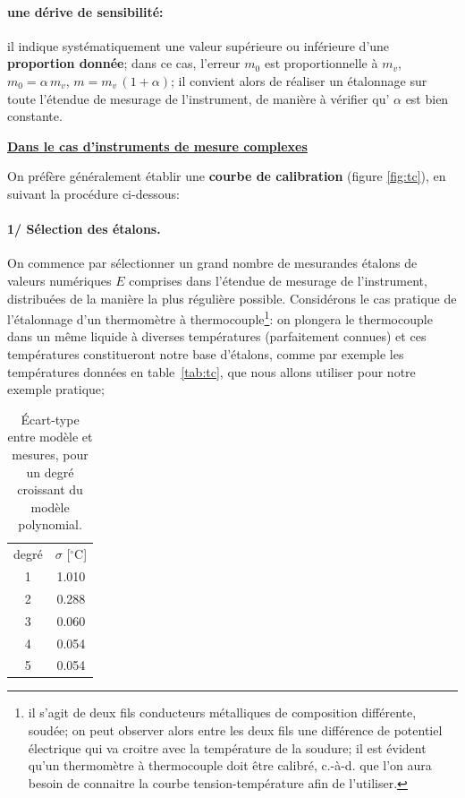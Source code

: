 \paragraph{une dérive de sensibilité:} il indique systématiquement une valeur supérieure ou inférieure d'une \textbf{proportion donnée}; dans ce cas, l'erreur $m_0$ est proportionnelle à $m_v$, $m_0=\alpha\,m_v$, $m=m_v\,(1+\alpha)$; il convient alors de réaliser un étalonnage sur toute l'étendue de mesurage de l'instrument, de manière à vérifier qu’ $\alpha$ est bien constante.

\begin{flushleft}
\underline{\textbf{Dans le cas d'instruments de mesure complexes}}
\end{flushleft}
On préfère généralement établir une \textbf{courbe de calibration} (figure \ref{fig:tc}), en suivant la procédure ci-dessous:
\paragraph{1/ Sélection des étalons.} On commence par sélectionner un grand nombre de mesurandes étalons de valeurs numériques $E$ comprises dans l'étendue de mesurage de l'instrument, distribuées de la manière la plus régulière possible. Considérons le cas pratique de l'étalonnage d'un thermomètre à thermocouple\footnote{il s'agit de deux fils conducteurs métalliques de composition différente, soudée; on peut observer alors entre les deux fils une différence de potentiel électrique qui va croitre avec la température de la soudure; il est évident qu'un thermomètre à thermocouple doit être calibré, c.-à-d. que l'on aura besoin de connaitre la courbe tension-température afin de l'utiliser.}: on plongera le thermocouple dans un même liquide à diverses températures (parfaitement connues) et ces températures constitueront notre base d'étalons, comme par exemple les températures données en table~\ref{tab:tc}, que nous allons utiliser pour notre exemple pratique;
\begin{table}
\vspace{-3mm}
\caption{Écart-type entre modèle et mesures, pour un degré croissant du modèle polynomial.}
\begin{center}
\begin{tabular}{c|c}
degré & $\sigma$ [$^\circ$C] \\
 1 &  1.010 \\
 2 &  0.288 \\
 3 &  0.060 \\
 4 &  0.054 \\
 5 &  0.054
 \end{tabular}
\end{center}
\label{tab:tc2}
\end{table}
